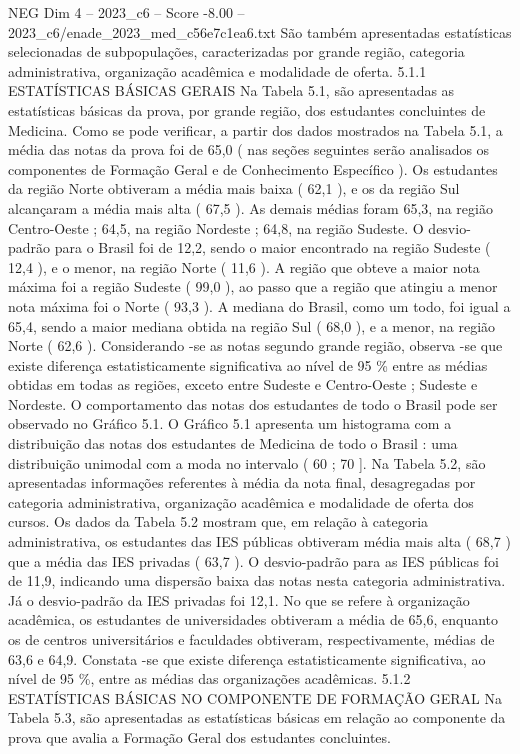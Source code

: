 \begin{textsample}{NEG Dim 4 – 2023\_c6 – Score -8.00 – 2023\_c6/enade\_2023\_med\_c56e7c1ea6.txt}
São também apresentadas estatísticas selecionadas de subpopulações, caracterizadas por grande região, categoria administrativa, organização acadêmica e modalidade de oferta. 5.1.1 ESTATÍSTICAS BÁSICAS GERAIS Na Tabela 5.1, são apresentadas as estatísticas básicas da prova, por grande região, dos estudantes concluintes de Medicina.
Como se pode verificar, a partir dos dados mostrados na Tabela 5.1, a média das notas da prova foi de 65,0 ( nas seções seguintes serão analisados os componentes de Formação Geral e de Conhecimento Específico ).
Os estudantes da região Norte obtiveram a média mais baixa ( 62,1 ), e os da região Sul alcançaram a média mais alta ( 67,5 ).
As demais médias foram 65,3, na região Centro-Oeste ; 64,5, na região Nordeste ; 64,8, na região Sudeste.
O desvio-padrão para o Brasil foi de 12,2, sendo o maior encontrado na região Sudeste ( 12,4 ), e o menor, na região Norte ( 11,6 ).
A região que obteve a maior nota máxima foi a região Sudeste ( 99,0 ), ao passo que a região que atingiu a menor nota máxima foi o Norte ( 93,3 ).
A mediana do Brasil, como um todo, foi igual a 65,4, sendo a maior mediana obtida na região Sul ( 68,0 ), e a menor, na região Norte ( 62,6 ).
Considerando -se as notas segundo grande região, observa -se que existe diferença estatisticamente significativa ao nível de 95 \% entre as médias obtidas em todas as regiões, exceto entre Sudeste e Centro-Oeste ; Sudeste e Nordeste.
O comportamento das notas dos estudantes de todo o Brasil pode ser observado no Gráfico 5.1.
O Gráfico 5.1 apresenta um histograma com a distribuição das notas dos estudantes de Medicina de todo o Brasil : uma distribuição unimodal com a moda no intervalo ( 60 ; 70 ].
Na Tabela 5.2, são apresentadas informações referentes à média da nota final, desagregadas por categoria administrativa, organização acadêmica e modalidade de oferta dos cursos.
Os dados da Tabela 5.2 mostram que, em relação à categoria administrativa, os estudantes das IES públicas obtiveram média mais alta ( 68,7 ) que a média das IES privadas ( 63,7 ).
O desvio-padrão para as IES públicas foi de 11,9, indicando uma dispersão baixa das notas nesta categoria administrativa.
Já o desvio-padrão da IES privadas foi 12,1.
No que se refere à organização acadêmica, os estudantes de universidades obtiveram a média de 65,6, enquanto os de centros universitários e faculdades obtiveram, respectivamente, médias de 63,6 e 64,9.
Constata -se que existe diferença estatisticamente significativa, ao nível de 95 \%, entre as médias das organizações acadêmicas. 5.1.2 ESTATÍSTICAS BÁSICAS NO COMPONENTE DE FORMAÇÃO GERAL Na Tabela 5.3, são apresentadas as estatísticas básicas em relação ao componente da prova que avalia a Formação Geral dos estudantes concluintes.

\end{textsample}
